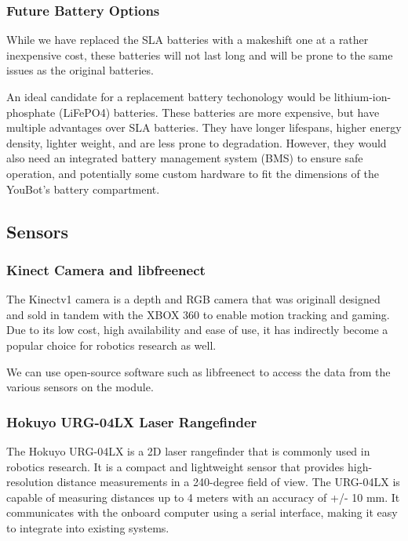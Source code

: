 \documentclass[a4paper, 12pt]{article}
\newif\ifshownotes
\newcommand{\notes}[1]{\ifshownotes\textcolor{blue}{#1}\fi}
\begin{document}
    \subsubsection{Future Battery Options}

    While we have replaced the SLA batteries with a makeshift one at a rather inexpensive cost, these batteries will not last long and will be prone to the same issues as the original batteries. 

    An ideal candidate for a replacement battery techonology would be lithium-ion-phosphate (LiFePO4) batteries. These batteries are more expensive, but have multiple advantages over SLA batteries. They have longer lifespans, higher energy density, lighter weight, and are less prone to degradation. However, they would also need an integrated battery management system (BMS) to ensure safe operation, and potentially some custom hardware to fit the dimensions of the YouBot's battery compartment. 


    
    \subsection{Sensors}
    \subsubsection{Kinect Camera and libfreenect}

    The Kinectv1 camera is a depth and RGB camera that was originall designed and sold in tandem with the XBOX 360 to enable motion tracking and gaming. Due to its low cost, high availability and ease of use, it has indirectly become a popular choice for robotics research as well. 

    We can use open-source software such as libfreenect to access the data from the various sensors on the module.


    \notes{discuss the libfreenect library, how to install it, and how it could be used within ROS.}


    \subsubsection{Hokuyo URG-04LX Laser Rangefinder}

    The Hokuyo URG-04LX is a 2D laser rangefinder that is commonly used in robotics research. It is a compact and lightweight sensor that provides high-resolution distance measurements in a 240-degree field of view. The URG-04LX is capable of measuring distances up to 4 meters with an accuracy of +/- 10 mm. It communicates with the onboard computer using a serial interface, making it easy to integrate into existing systems.
\end{document}
